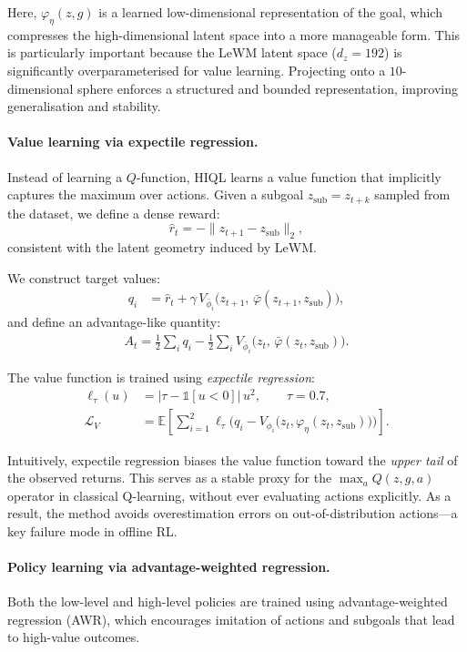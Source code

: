 Here, $\varphi_\eta(z,g)$ is a learned low-dimensional representation of
the goal, which compresses the high-dimensional latent space into a more
manageable form. This is particularly important because the LeWM latent
space ($d_z=192$) is significantly overparameterised for value learning.
Projecting onto a $10$-dimensional sphere enforces a structured and
bounded representation, improving generalisation and stability.

\paragraph{Value learning via expectile regression.}
Instead of learning a $Q$-function, HIQL learns a value function that
implicitly captures the maximum over actions. Given a subgoal
$z_{\mathrm{sub}} = z_{t+k}$ sampled from the dataset, we define a dense
reward:
\[
\hat r_t = -\|z_{t+1} - z_{\mathrm{sub}}\|_2,
\]
consistent with the latent geometry induced by LeWM.

We construct target values:
\begin{align}
q_i &= \hat r_t + \gamma\,V_{\bar\phi_i}\!\big(z_{t+1},\,\bar\varphi(z_{t+1}, z_{\mathrm{sub}})\big),
\end{align}
and define an advantage-like quantity:
\begin{align}
A_t = \frac{1}{2}\sum_i q_i - \frac{1}{2}\sum_i V_{\bar\phi_i}\!\big(z_t,\,\bar\varphi(z_t, z_{\mathrm{sub}})\big).
\end{align}

The value function is trained using \emph{expectile regression}:
\begin{align}
\ell_\tau(u) &= \big|\tau - \mathbb{1}[u < 0]\big|\,u^2, \qquad \tau = 0.7, \\
\mathcal{L}_V &= \mathbb{E}\!\left[\sum_{i=1}^{2}
\ell_\tau\!\Big(q_i - V_{\phi_i}\!\big(z_t, \varphi_\eta(z_t, z_{\mathrm{sub}})\big)\Big)\right].
\end{align}

Intuitively, expectile regression biases the value function toward the
\emph{upper tail} of the observed returns. This serves as a stable proxy
for the $\max_a Q(z,g,a)$ operator in classical Q-learning, without ever
evaluating actions explicitly. As a result, the method avoids
overestimation errors on out-of-distribution actions—a key failure mode
in offline RL.

\paragraph{Policy learning via advantage-weighted regression.}
Both the low-level and high-level policies are trained using
advantage-weighted regression (AWR), which encourages imitation of
actions and subgoals that lead to high-value outcomes.


